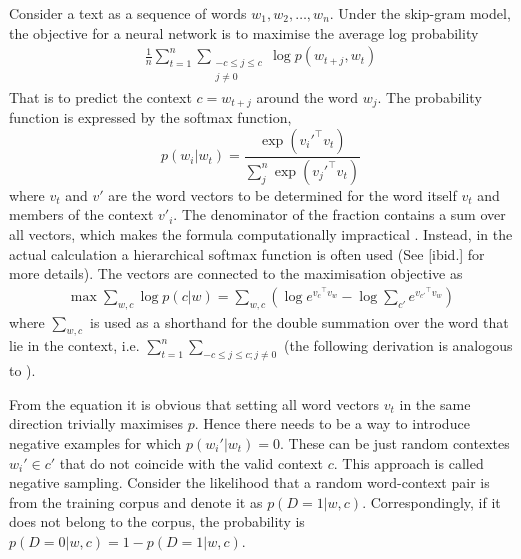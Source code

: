 \documentclass[10pt, a4paper]{UUThesisTemplate}
\begin{document}
Consider a text as a sequence of words $w_1, w_2, \ldots, w_n$. Under the skip-gram model, the objective for a neural network is to maximise the average log probability
\begin{align}
\frac 1n \sum\limits_{t=1}^n \sum\limits_{\begin{smallmatrix}-c\le j\le c\\j\ne 0\end{smallmatrix}} \log p(w_{t+j}, w_t)
\end{align}
That is to predict the context $c = w_{t+j}$ around the word $w_j$. The probability function is expressed by the softmax function,
\begin{equation}\label{eq:softmax}
p(w_{i}|w_t) = \frac{\exp\left({v_i'}^\intercal v_t\right)}{\sum_j^n\exp\left({v_j'}^\intercal v_t\right)}
\end{equation}
where $v_t$ and $v'$ are the word vectors to be determined for the word itself $v_t$ and members of the context $v'_i$. The denominator of the fraction contains a sum over all vectors, which makes the formula computationally impractical \cite{skipgram}. Instead, in the actual calculation a hierarchical softmax function is often used (See [ibid.] for more details). The vectors are connected to the maximisation objective as
\begin{align}
\max \sum_{w, c} \log p(c|w) = \sum_{w, c} \left( \log e^{{v_c}^\intercal v_w} - \log \sum_{c'} e^{{{v_{c'}}^\intercal v_w}}\right)
\end{align}
where $\sum_{w,c}$ is used as a shorthand for the double summation over the word that lie in the context, i.e. $\sum_{t=1}^n\sum_{-c\le j \le c; j\ne 0}$ (the following derivation is analogous to \cite{word2vecexplained}).

From the equation it is obvious that setting all word vectors $v_t$ in the same direction trivially maximises $p$. Hence there needs to be a way to introduce negative examples for which $p(w_i'|w_t) =0$. These can be just random contextes $w_i'\in c'$ that do not coincide with the valid context $c$. This approach is called negative sampling. Consider the likelihood that a random word-context pair is from the training corpus and denote it as $p(D=1|w,c)$. Correspondingly, if it does not belong to the corpus, the probability is $p(D=0|w,c) = 1 - p(D=1|w,c)$. 
\end{document}
